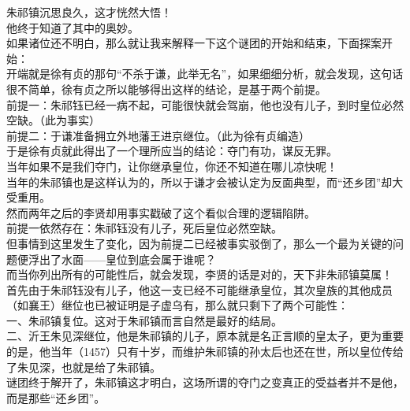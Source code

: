 \begin{multicols}{\theparacolNo}
朱祁镇沉思良久，这才恍然大悟！\\

他终于知道了其中的奥妙。\\

如果诸位还不明白，那么就让我来解释一下这个谜团的开始和结束，下面探案开始：\\

开端就是徐有贞的那句“不杀于谦，此举无名”，如果细细分析，就会发现，这句话很不简单，徐有贞之所以能够得出这样的结论，是基于两个前提。\\

前提一：朱祁钰已经一病不起，可能很快就会驾崩，他也没有儿子，到时皇位必然空缺。（此为事实）\\

前提二：于谦准备拥立外地藩王进京继位。（此为徐有贞编造）\\

于是徐有贞就此得出了一个理所应当的结论：夺门有功，谋反无罪。\\

当年如果不是我们夺门，让你继承皇位，你还不知道在哪儿凉快呢！\\

当年的朱祁镇也是这样认为的，所以于谦才会被认定为反面典型，而“还乡团”却大受重用。\\

然而两年之后的李贤却用事实戳破了这个看似合理的逻辑陷阱。\\

前提一依然存在：朱祁钰没有儿子，死后皇位必然空缺。\\

但事情到这里发生了变化，因为前提二已经被事实驳倒了，那么一个最为关键的问题便浮出了水面——皇位到底会属于谁呢？\\

而当你列出所有的可能性后，就会发现，李贤的话是对的，天下非朱祁镇莫属！\\

首先由于朱祁钰没有儿子，他这一支已经不可能继承皇位，其次皇族的其他成员（如襄王）继位也已被证明是子虚乌有，那么就只剩下了两个可能性：\\

一、朱祁镇复位。这对于朱祁镇而言自然是最好的结局。\\

二、沂王朱见深继位，他是朱祁镇的儿子，原本就是名正言顺的皇太子，更为重要的是，他当年（1457）只有十岁，而维护朱祁镇的孙太后也还在世，所以皇位传给了朱见深，也就是给了朱祁镇。\\

谜团终于解开了，朱祁镇这才明白，这场所谓的夺门之变真正的受益者并不是他，而是那些“还乡团”。\\


\end{multicols}
